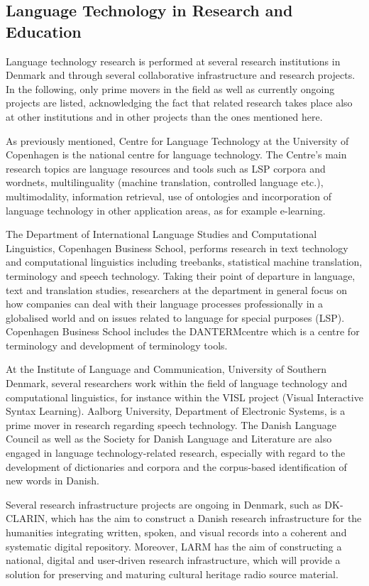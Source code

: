 \begin{multicols}{2}
\subsection{Language Technology in Research and Education}

  Language technology research is performed at several research institutions in Denmark and through several collaborative infrastructure and research projects. In the following, only prime movers in the field as well as currently ongoing projects are listed, acknowledging the fact that related research takes place also at other institutions and in other projects than the ones mentioned here.

As previously mentioned, Centre for Language Technology at the University of Copenhagen is the national centre for language technology.  The Centre's main research topics are language resources and tools such as LSP corpora and wordnets, multilinguality (machine translation, controlled language etc.), multimodality, information retrieval, use of ontologies and incorporation of language technology in other application areas, as for example e-learning.

The Department of International Language Studies and Computational Linguistics, Copenhagen Business School, performs research in text technology and computational linguistics including tree\-banks, statistical machine translation, terminology and speech technology. Taking their point of departure in language, text and translation studies, researchers at the department  in general focus on how companies can deal with their language processes professionally in a globalised world and on issues related to language for special purposes (LSP). Copenhagen Business School includes the DANTERMcentre which is a centre for terminology and development of terminology tools.

At the Institute of Language and Communication, University of Southern Denmark, several researchers work within the field of language technology and computational linguistics, for instance within the VISL project (Visual Interactive Syntax Learning). Aalborg University, Department of Electronic Systems, is a prime mover in research regarding speech technology. The Danish Language Council as well as the Society for Danish Language and Literature are also engaged in language technology-related research, especially with regard to the development of dictionaries and corpora and the corpus-based identification of new words in Danish. 

Several research infrastructure projects are ongoing in Denmark, such as DK-CLARIN, which has the aim to construct a Danish research infrastructure for the humanities integrating written, spoken, and visual records into a coherent and systematic digital repository. Moreover, LARM has the aim of constructing a national, digital and user-driven research infrastructure, which will provide a solution for preserving and maturing cultural heritage radio source material. 


\end{multicols}
